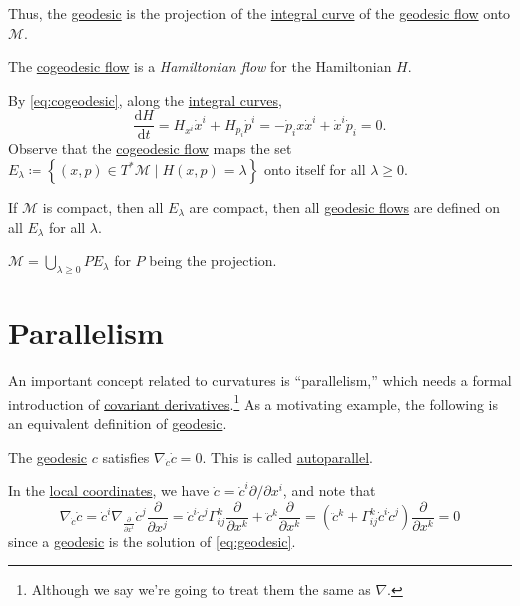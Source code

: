 Thus, the \hyperref[def:geodesic]{geodesic} is the projection of the \hyperref[def:integral-curve]{integral curve} of the \hyperref[def:geodesic-flow]{geodesic flow} onto \(\mathcal{M} \).

\begin{remark}
	The \hyperref[def:cogeodesic-flow]{cogeodesic flow} is a \emph{Hamiltonian flow} for the Hamiltonian \(H\).
\end{remark}
\begin{explanation}
	By \autoref{eq:cogeodesic}, along the \hyperref[def:integral-curve]{integral curves},
	\[
		\frac{\mathrm{d}H}{\mathrm{d}t}
		= H_{x^i} \dot{x}^i + H_{p_i}\dot{p}^i
		= -\dot{p}_i x\dot{x}^i + \dot{x}^i \dot{p}_i = 0.
	\]
	Observe that the \hyperref[def:cogeodesic-flow]{cogeodesic flow} maps the set \(E_\lambda \coloneqq \left\{ (x, p)\in T^{\ast} \mathcal{M} \mid H(x, p) = \lambda  \right\}\) onto itself for all \(\lambda \geq 0\).
\end{explanation}

\begin{remark}
	If \(\mathcal{M} \) is compact, then all \(E_\lambda \) are compact, then all \hyperref[def:geodesic-flow]{geodesic flows} are defined on all \(E_\lambda \) for all \(\lambda \).
\end{remark}

\begin{remark}
	\(\mathcal{M} = \bigcup_{\lambda \geq 0} P E_\lambda \) for \(P\) being the projection.
\end{remark}

\section{Parallelism}
An important concept related to curvatures is ``parallelism,'' which needs a formal introduction of \hyperref[def:covariant-derivative]{covariant derivatives}.\footnote{Although we say we're going to treat them the same as \(\nabla \).} As a motivating example, the following is an equivalent definition of \hyperref[def:geodesic]{geodesic}.

\begin{eg}[Autoparallel]
	The \hyperref[def:geodesic]{geodesic} \(c\) satisfies \(\nabla _{\dot{c} } \dot{c} = 0\). This is called \hyperref[def:autoparallel]{autoparallel}.
\end{eg}
\begin{explanation}
	In the \hyperref[def:coordinate-chart]{local coordinates}, we have \(\dot{c} = \dot{c}^i \partial / \partial x^i\), and note that
	\begin{equation}\label{eq:autoparallel-geodesic}
		\nabla _{\dot{c}}\dot{c}
		= \dot{c}^i \nabla _{\frac{\partial }{\partial x^i} } \dot{c}^j \frac{\partial }{\partial x^j}
		= \dot{c}^i \dot{c}^j \Gamma _{ij}^k \frac{\partial }{\partial x^k} + \ddot{c}^k \frac{\partial }{\partial x^k}
		= \left( \ddot{c}^k + \Gamma _{ij}^k \dot{c}^i \dot{c}^j \right) \frac{\partial }{\partial x^k}
		= 0
	\end{equation}
	since a \hyperref[def:geodesic]{geodesic} is the solution of \autoref{eq:geodesic}.
\end{explanation}

